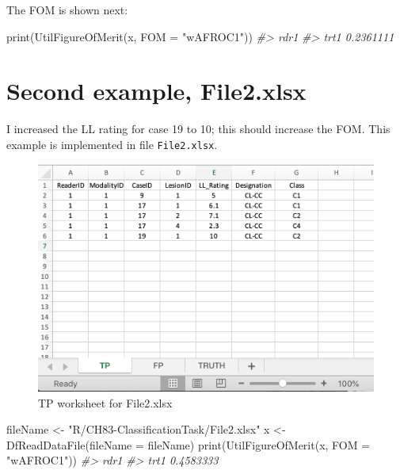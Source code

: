 \documentclass[
]{book}
\newenvironment{Shaded}{\begin{snugshade}}{\end{snugshade}}
\newcommand{\AttributeTok}[1]{\textcolor[rgb]{0.77,0.63,0.00}{#1}}
\newcommand{\CommentTok}[1]{\textcolor[rgb]{0.56,0.35,0.01}{\textit{#1}}}
\newcommand{\FunctionTok}[1]{\textcolor[rgb]{0.00,0.00,0.00}{#1}}
\newcommand{\NormalTok}[1]{#1}
\newcommand{\OtherTok}[1]{\textcolor[rgb]{0.56,0.35,0.01}{#1}}
\newcommand{\StringTok}[1]{\textcolor[rgb]{0.31,0.60,0.02}{#1}}
\begin{document}
The FOM is shown next:

\begin{Shaded}
\begin{Highlighting}[]
\FunctionTok{print}\NormalTok{(}\FunctionTok{UtilFigureOfMerit}\NormalTok{(x, }\AttributeTok{FOM =} \StringTok{"wAFROC1"}\NormalTok{))}
\CommentTok{\#\textgreater{}           rdr1}
\CommentTok{\#\textgreater{} trt1 0.2361111}
\end{Highlighting}
\end{Shaded}

\hypertarget{classification-tasks-example2}{%
\section{Second example, File2.xlsx}\label{classification-tasks-example2}}

I increased the LL rating for case 19 to 10; this should increase the FOM. This example is implemented in file \texttt{File2.xlsx}.

\begin{figure}

{\centering \includegraphics[width=0.5\linewidth,height=0.2\textheight]{images/classification/File2TP} 

}

\caption{TP worksheet for File2.xlsx}\label{fig:File2TP}
\end{figure}

\begin{Shaded}
\begin{Highlighting}[]
\NormalTok{fileName }\OtherTok{\textless{}{-}} \StringTok{"R/CH83{-}ClassificationTask/File2.xlsx"}
\NormalTok{x }\OtherTok{\textless{}{-}} \FunctionTok{DfReadDataFile}\NormalTok{(}\AttributeTok{fileName =}\NormalTok{ fileName)}
\FunctionTok{print}\NormalTok{(}\FunctionTok{UtilFigureOfMerit}\NormalTok{(x, }\AttributeTok{FOM =} \StringTok{"wAFROC1"}\NormalTok{))}
\CommentTok{\#\textgreater{}           rdr1}
\CommentTok{\#\textgreater{} trt1 0.4583333}
\end{Highlighting}
\end{Shaded}
\end{document}
